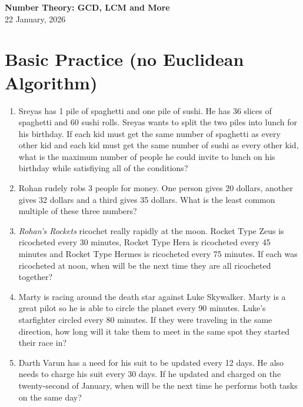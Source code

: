 \documentclass[a4paper]{article}
\begin{document}
\begin{center}
{\Large\bfseries Number Theory: GCD, LCM and More}\\[0.25cm]
{\large 22 January, 2026}\\[1cm]
\end{center}

\section{Basic Practice (no Euclidean Algorithm)}
\begin{enumerate}[itemsep=2.85cm]
    \item Sreyas has 1 pile of spaghetti and one pile of sushi. He has 36 slices of spaghetti and 60 sushi rolls. Sreyas wants to split the two piles into lunch for his birthday. If each kid must get the same number of spaghetti as every other kid and  each kid must get the same number of sushi as every other kid, what is the maximum number of people he could invite to lunch on his birthday while satisfiying all of the conditions?
    \item Rohan rudely robs 3 people for money. One person gives 20 dollars, another gives 32 dollars and a third gives 35 dollars. What is the least common multiple of these three numbers?
    \item \textit{Rohan's Rockets} ricochet really rapidly at the moon. Rocket Type Zeus is ricocheted every 30 minutes, Rocket Type Hera is ricocheted every 45 minutes and Rocket Type Hermes is ricocheted every 75 minutes. If each was ricocheted at noon, when will be the next time they are all ricocheted together?
    \item Marty is racing around the death star against Luke Skywalker. Marty is a great pilot so he is able to circle the planet every 90 minutes. Luke's starfighter circled every 80 minutes. If they were traveling in the same direction, how long will it take them to meet in the same spot they started their race in?
    \item Darth Varun has a need for his suit to be updated every 12 days. He also needs to charge his suit every 30 days. If he updated and charged on the twenty-second of January, when will be the next time he performs both tasks on the same day?
\end{enumerate}
\newpage
\end{document}
